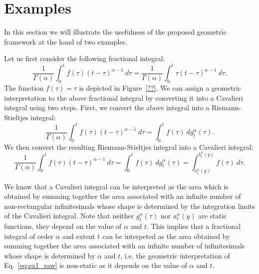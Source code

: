 \documentclass{article}
\theoremstyle{theorem}
\theoremstyle{definition}
\begin{document}
\section{Examples}
In this section we will illustrate the usefulness of the proposed geometric framework at the hand of two examples.

Let us first consider the following fractional integral:
\begin{equation}
\label{eq:ex1_raw}
\frac{1}{\Gamma(\alpha)}\int_0^t f(\tau) (t-\tau)^{\alpha-1}~d\tau = \frac{1}{\Gamma(\alpha)}\int_0^t \tau(t-\tau)^{\alpha-1}~d\tau. 
\end{equation}
The function $f(\tau) =\tau$ is depicted in Figure~\ref{??}. We can assign a geometric interpretation to the above fractional integral by converting it into a Cavalieri integral using two steps. First, we convert 
the above integral into a Riemann-Stieltjes integral:
\begin{equation}
\frac{1}{\Gamma(\alpha)}\int_0^t f(\tau) (t-\tau)^{\alpha-1}~d\tau = \int_0^t f(\tau)~dg_t^{\alpha}(\tau). 
\end{equation}
We then convert the resulting Riemann-Stieltjes integral into a Cavalieri integral:
\begin{equation}
\label{eq:ex1}
\frac{1}{\Gamma(\alpha)}\int_0^t f(\tau) (t-\tau)^{\alpha-1}~d\tau = \int_0^t f(\tau)~dg_t^{\alpha}(\tau)=\int_{a_t^{\alpha}(y)}^{b_t^{\alpha}(y)} f(\tau)~d\tau. 
\end{equation}

We know that a Cavalieri integral can be interpreted as the area which is obtained by summing together the area associated with an infinite number of non-rectangular infinitesimals whose shape 
is determined by the integration limits of the Cavalieri integral. Note that neither $g_t^{\alpha}(\tau)$ nor $a_t^{\alpha}(y)$ are static functions, 
they depend on the value of $\alpha$ and $t$. This implies that a fractional integral of order $\alpha$ and extent $t$ can be interpeted as the area obtained by summing together the area associated with an infinite number of infinitesimals whose 
shape is determined by $\alpha$ and $t$, i.e. the geometric interpretation of Eq.~\eqref{eq:ex1_raw} is non-static as it depends on the value of $\alpha$ and $t$.
\end{document}
